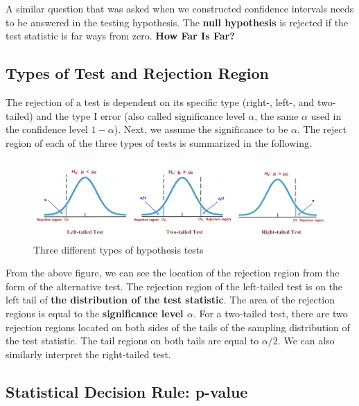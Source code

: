 \documentclass[
]{book}
\begin{document}
A similar question that was asked when we constructed confidence intervals needs to be answered in the testing hypothesis. The \textbf{null hypothesis} is rejected if the test statistic is far ways from zero. \textbf{{How Far Is Far?}}

\hypertarget{types-of-test-and-rejection-region}{%
\subsection{Types of Test and Rejection Region}\label{types-of-test-and-rejection-region}}

The rejection of a test is dependent on its specific type (right-, left-, and two-tailed) and the type I error (also called significance level \(\alpha\), the same \(\alpha\) used in the confidence level \(1-\alpha\)). Next, we assume the significance to be \(\alpha\). The reject region of each of the three types of tests is summarized in the following.

\begin{figure}

{\centering \includegraphics[width=0.8\linewidth]{img07/w07-Test-types} 

}

\caption{Three different types of hypothesis tests}\label{fig:unnamed-chunk-111}
\end{figure}

From the above figure, we can see the location of the rejection region from the form of the alternative test. The rejection region of the left-tailed test is on the left tail of \textbf{the distribution of the test statistic}. The area of the rejection regions is equal to the \textbf{significance level \(\alpha\)}. For a two-tailed test, there are two rejection regions located on both sides of the tails of the sampling distribution of the test statistic. The tail regions on both tails are equal to \(\alpha/2\). We can also similarly interpret the right-tailed test.

\hypertarget{statistical-decision-rule-p-value}{%
\subsection{Statistical Decision Rule: p-value}\label{statistical-decision-rule-p-value}}
\end{document}
